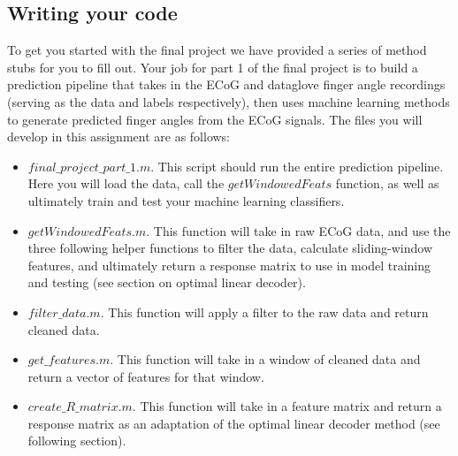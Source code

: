 \documentclass{article}
\begin{document}
\subsection*{Writing your code}
To get you started with the final project we have provided a series of method stubs for you to fill out. Your job for part 1 of the final project is to build a prediction pipeline that takes in the ECoG and dataglove finger angle recordings (serving as the data and labels respectively), then uses machine learning methods to generate predicted finger angles from the ECoG signals. The files you will develop in this assignment are as follows:\\
\begin{itemize}
    \item $final\_project\_part\_1.m$. This script should run the entire prediction pipeline. Here you will load the data, call the $getWindowedFeats$ function, as well as ultimately train and test your machine learning classifiers.
    \item $getWindowedFeats.m$. This function will take in raw ECoG data, and use the three following helper functions to filter the data, calculate sliding-window features, and ultimately return a response matrix to use in model training and testing (see section on optimal linear decoder).
    \item $filter\_data.m$. This function will apply a filter to the raw data and return cleaned data.
    \item $get\_features.m$. This function will take in a window of cleaned data and return a vector of features for that window.
    \item $create\_R\_matrix.m$. This function will take in a feature matrix and return a response matrix as an adaptation of the optimal linear decoder method (see following section). 
\end{itemize}
\end{document}

